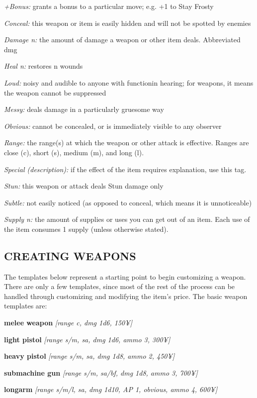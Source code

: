 \documentclass[oneside,10pt]{article}
\begin{document}
\begin{multicols}{2}
\begin{adjustwidth*}{.5cm}{.5cm}
\textit{+Bonus:} grants a bonus to a particular move; e.g. +1 to
Stay Frosty

\textit{Conceal:} this weapon or item is easily hidden and will not
be spotted by enemies

\textit{Damage n:} the amount of damage a weapon or other item
deals. Abbreviated dmg

\textit{Heal n:} restores n wounds

\textit{Loud:} noisy and audible to anyone with functionin hearing;
for weapons, it means the weapon cannot be suppressed

\textit{Messy:} deals damage in a particularly gruesome way

\textit{Obvious:} cannot be concealed, or is immediately visible to
any observer

\textit{Range:} the range(s) at which the weapon or other attack is
effective. Ranges are close (c), short (s), medium (m), and
long (l).

\textit{Special (description):} if the effect of the item requires explanation, use this tag.

\textit{Stun:} this weapon or attack deals Stun damage only

\textit{Subtle:} not easily noticed (as opposed to conceal, which
means it is unnoticeable)

\textit{Supply n:} the amount of supplies or uses you can get out
of an item. Each use of the item consumes 1 supply (unless
otherwise stated).
\end{adjustwidth*}

\subsection{CREATING WEAPONS}
The templates below represent a starting point to begin customizing a weapon. There are only a few templates, since
most of the rest of the process can be handled through customizing and modifying the item’s price. The basic weapon
templates are:

\textbf{melee weapon} \textit{[range c, dmg 1d6, 150¥]}

\textbf{light pistol} \textit{[range s/m, sa, dmg 1d6, ammo 3, 300¥]}

\textbf{heavy pistol} \textit{[range s/m, sa, dmg 1d8, ammo 2, 450¥]}

\textbf{submachine gun} \textit{[range s/m, sa/bf, dmg 1d8, ammo 3,
700¥]}

\textbf{longarm} \textit{[range s/m/l, sa, dmg 1d10, AP 1, obvious,
ammo 4, 600¥]}


\end{multicols}
\end{document}
